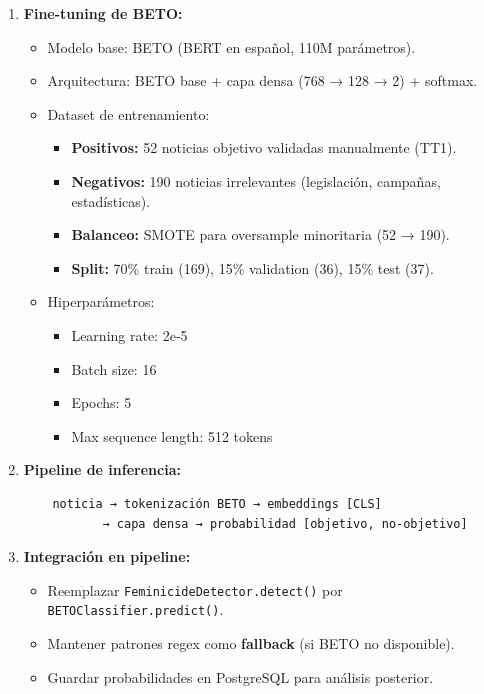 \begin{enumerate}
    \item \textbf{Fine-tuning de BETO:}
    \begin{itemize}
        \item Modelo base: BETO (BERT en español, 110M parámetros).
        \item Arquitectura: BETO base + capa densa (768 → 128 → 2) + softmax.
        \item Dataset de entrenamiento:
        \begin{itemize}
            \item \textbf{Positivos:} 52 noticias objetivo validadas manualmente (TT1).
            \item \textbf{Negativos:} 190 noticias irrelevantes (legislación, campañas, estadísticas).
            \item \textbf{Balanceo:} SMOTE para oversample minoritaria (52 → 190).
            \item \textbf{Split:} 70\% train (169), 15\% validation (36), 15\% test (37).
        \end{itemize}
        \item Hiperparámetros:
        \begin{itemize}
            \item Learning rate: 2e-5
            \item Batch size: 16
            \item Epochs: 5
            \item Max sequence length: 512 tokens
        \end{itemize}
    \end{itemize}
    
    \item \textbf{Pipeline de inferencia:}
    \begin{verbatim}
    noticia → tokenización BETO → embeddings [CLS] 
           → capa densa → probabilidad [objetivo, no-objetivo]
    \end{verbatim}
    
    \item \textbf{Integración en pipeline:}
    \begin{itemize}
        \item Reemplazar \texttt{FeminicideDetector.detect()} por \texttt{BETOClassifier.predict()}.
        \item Mantener patrones regex como \textbf{fallback} (si BETO no disponible).
        \item Guardar probabilidades en PostgreSQL para análisis posterior.
    \end{itemize}
\end{enumerate}

